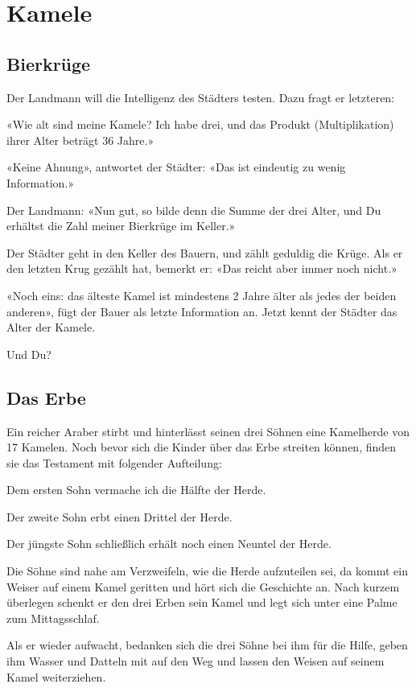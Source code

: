 \newpage


\section{Kamele}
\subsection{Bierkrüge}

Der Landmann will die Intelligenz des Städters testen. Dazu fragt er letzteren:

«Wie alt sind meine Kamele? Ich habe drei, und das Produkt (Multiplikation)
ihrer Alter beträgt 36 Jahre.»

«Keine Ahnung», antwortet der Städter: «Das ist eindeutig zu wenig
Information.»

Der Landmann: «Nun gut, so bilde denn die Summe der drei Alter, und Du
erhältst die Zahl meiner Bierkrüge im Keller.»

Der Städter geht in den Keller des Bauern, und zählt geduldig die Krüge. Als er
den letzten Krug gezählt hat, bemerkt er: «Das reicht aber immer noch nicht.»

«Noch eins: das älteste Kamel ist mindestens 2 Jahre älter als jedes der beiden
anderen», fügt der Bauer als letzte Information an. Jetzt kennt der
Städter das Alter der Kamele.

Und Du?
\TNTeop{}


\subsection{Das Erbe}
Ein reicher Araber stirbt und hinterlässt seinen drei Söhnen eine Kamelherde
von 17 Kamelen. Noch bevor sich die Kinder über das Erbe streiten können,
finden sie das Testament mit folgender Aufteilung:

Dem ersten Sohn vermache ich die Hälfte der Herde.

Der zweite Sohn erbt einen Drittel der Herde.

Der jüngste Sohn schließlich erhält noch einen Neuntel der Herde.

Die Söhne sind nahe am Verzweifeln, wie die Herde aufzuteilen sei, da kommt
ein Weiser auf einem Kamel geritten und hört sich die Geschichte an. Nach
kurzem überlegen schenkt er den drei Erben sein Kamel und legt sich unter eine
Palme zum Mittagsschlaf.

Als er wieder aufwacht, bedanken sich die drei Söhne bei ihm für die Hilfe,
geben ihm Wasser und Datteln mit auf den Weg und lassen den Weisen auf
seinem Kamel weiterziehen.

